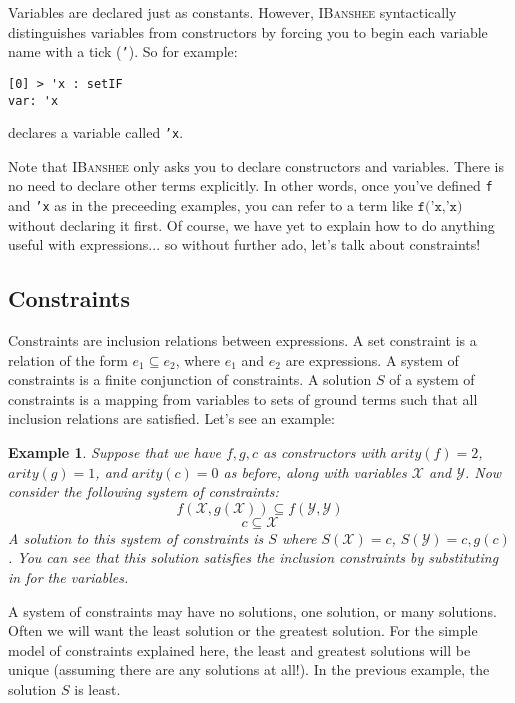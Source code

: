 \documentclass{article}
\newcommand{\ibanshee}{\textsc{IBanshee}}
\newcommand{\var}[1]{\mathcal{#1}}
\newtheorem{example}{Example}
\begin{document}
Variables are declared just as constants. However, \ibanshee{}
syntactically distinguishes variables from constructors by forcing you
to begin each variable name with a tick (\texttt{'}). So for example:

\begin{verbatim}
[0] > 'x : setIF
var: 'x
\end{verbatim}

declares a variable called \texttt{'x}.

Note that \ibanshee{} only asks you to declare constructors and
variables. There is no need to declare other terms explicitly. In
other words, once you've defined \texttt{f} and \texttt{'x} as in the
preceeding examples, you can refer to a term like $\texttt{f('x,'x)}$
without declaring it first. Of course, we have yet to explain how to
do anything useful with expressions... so without further ado, let's talk
about constraints!

\subsection{Constraints}

Constraints are inclusion relations between expressions. A set
constraint is a relation of the form $e_1 \subseteq e_2$, where $e_1$
and $e_2$ are expressions. A system of constraints is a finite
conjunction of constraints. A solution $S$ of a system of constraints
is a mapping from variables to sets of ground terms such that all
inclusion relations are satisfied. Let's see an example:

\begin{example}
Suppose that we have $f,g,c$ as constructors with $arity(f) = 2$,
$arity(g) = 1$, and $arity(c) = 0$ as before, along with variables
$\var{X}$ and $\var{Y}$. Now consider the following system of
constraints:
\[
f(\var{X},g(\var{X})) \subseteq f(\var{Y},\var{Y})
\]
\[
c \subseteq \var{X}
\]
A solution to this system of constraints is $S$ where $S(\var{X}) =
{c}$, $S(\var{Y}) = {c,g(c)}$. You can see that this solution
satisfies the inclusion constraints by substituting in for the
variables.
\end{example}

A system of constraints may have no solutions, one solution, or many
solutions. Often we will want the least solution or the greatest
solution. For the simple model of constraints explained here, the
least and greatest solutions will be unique (assuming there are any
solutions at all!). In the previous example, the solution $S$ is
least.
\end{document}
